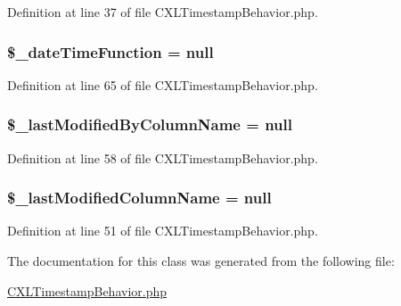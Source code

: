 Definition at line 37 of file CXLTimestampBehavior.php.

\hypertarget{classCXLTimeStampBehavior_a32224a162adf0502123d01d3fcbbcce7}{
\subsubsection[{\$\_\-dateTimeFunction}]{\setlength{\rightskip}{0pt plus 5cm}\$\_\-dateTimeFunction = null}}
\label{classCXLTimeStampBehavior_a32224a162adf0502123d01d3fcbbcce7}


Definition at line 65 of file CXLTimestampBehavior.php.

\hypertarget{classCXLTimeStampBehavior_a8aed01de613f89819b5268c88f933969}{
\subsubsection[{\$\_\-lastModifiedByColumnName}]{\setlength{\rightskip}{0pt plus 5cm}\$\_\-lastModifiedByColumnName = null}}
\label{classCXLTimeStampBehavior_a8aed01de613f89819b5268c88f933969}


Definition at line 58 of file CXLTimestampBehavior.php.

\hypertarget{classCXLTimeStampBehavior_a8f1b45a01bfe979c5ae98050cfcf804f}{
\subsubsection[{\$\_\-lastModifiedColumnName}]{\setlength{\rightskip}{0pt plus 5cm}\$\_\-lastModifiedColumnName = null}}
\label{classCXLTimeStampBehavior_a8f1b45a01bfe979c5ae98050cfcf804f}


Definition at line 51 of file CXLTimestampBehavior.php.



The documentation for this class was generated from the following file:\begin{DoxyCompactItemize}
\item 
\hyperlink{CXLTimestampBehavior_8php}{CXLTimestampBehavior.php}\end{DoxyCompactItemize}

